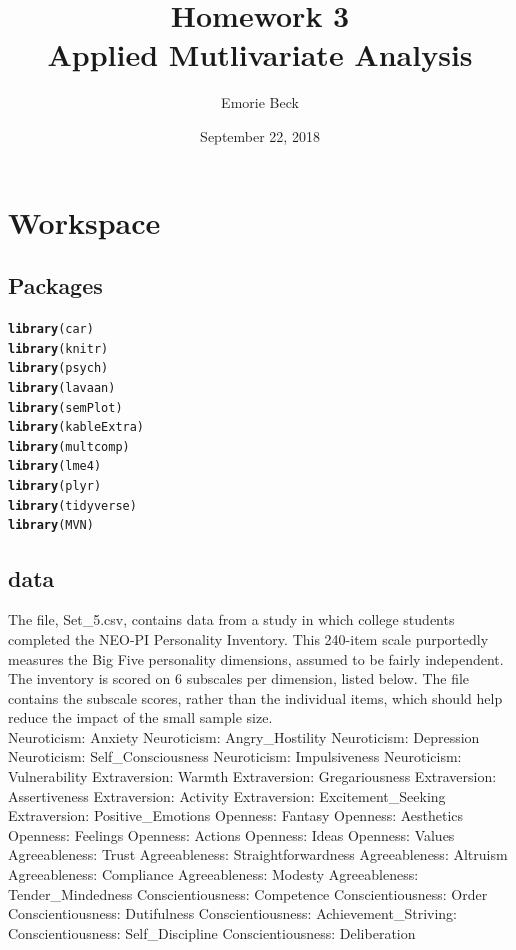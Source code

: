 \documentclass{article}\usepackage[]{graphicx}\usepackage[]{color}
\title{%
Homework 3\\
\large Applied Mutlivariate Analysis}
\date{September 22, 2018}
\author{Emorie Beck}
\makeatletter
\newcommand{\hlstd}[1]{\textcolor[rgb]{0.345,0.345,0.345}{#1}}%
\newcommand{\hlkwd}[1]{\textcolor[rgb]{0.737,0.353,0.396}{\textbf{#1}}}%
\newenvironment{kframe}{%
 \def\at@end@of@kframe{}%
 \ifinner\ifhmode%
  \def\at@end@of@kframe{\end{minipage}}%
  \begin{minipage}{\columnwidth}%
 \fi\fi%
 \def\FrameCommand##1{\hskip\@totalleftmargin \hskip-\fboxsep
 \colorbox{shadecolor}{##1}\hskip-\fboxsep
     \hskip-\linewidth \hskip-\@totalleftmargin \hskip\columnwidth}%
 \MakeFramed {\advance\hsize-\width
   \@totalleftmargin\z@ \linewidth\hsize
   \@setminipage}}%
 {\par\unskip\endMakeFramed%
 \at@end@of@kframe}
\newenvironment{knitrout}{}{} %
\makeatother
\begin{document}
\maketitle

\section{Workspace}
\subsection{Packages}



\begin{knitrout}
\color{fgcolor}\begin{kframe}
\begin{alltt}
\hlkwd{library}\hlstd{(car)}
\hlkwd{library}\hlstd{(knitr)}
\hlkwd{library}\hlstd{(psych)}
\hlkwd{library}\hlstd{(lavaan)}
\hlkwd{library}\hlstd{(semPlot)}
\hlkwd{library}\hlstd{(kableExtra)}
\hlkwd{library}\hlstd{(multcomp)}
\hlkwd{library}\hlstd{(lme4)}
\hlkwd{library}\hlstd{(plyr)}
\hlkwd{library}\hlstd{(tidyverse)}
\hlkwd{library}\hlstd{(MVN)}
\end{alltt}
\end{kframe}
\end{knitrout}



\subsection{data}
The file, Set\_5.csv, contains data from a study in which college students completed the NEO-PI Personality Inventory. This 240-item scale purportedly measures the Big Five personality dimensions, assumed to be fairly independent. The inventory is scored on 6 subscales per dimension, listed below. The file contains the subscale scores, rather than the individual items, which should help reduce the impact of the small sample size.\\

Neuroticism: Anxiety
Neuroticism: Angry\_Hostility
Neuroticism: Depression
Neuroticism: Self\_Consciousness
Neuroticism: Impulsiveness
Neuroticism: Vulnerability
Extraversion: Warmth
Extraversion: Gregariousness
Extraversion: Assertiveness
Extraversion: Activity
Extraversion: Excitement\_Seeking
Extraversion: Positive\_Emotions
Openness: Fantasy
Openness: Aesthetics
Openness: Feelings
Openness: Actions
Openness: Ideas
Openness: Values
Agreeableness: Trust
Agreeableness: Straightforwardness 
Agreeableness: Altruism
Agreeableness: Compliance
Agreeableness: Modesty
Agreeableness: Tender\_Mindedness
Conscientiousness: Competence
Conscientiousness: Order
Conscientiousness: Dutifulness
Conscientiousness: Achievement\_Striving: 
Conscientiousness: Self\_Discipline
Conscientiousness: Deliberation
\end{document}
